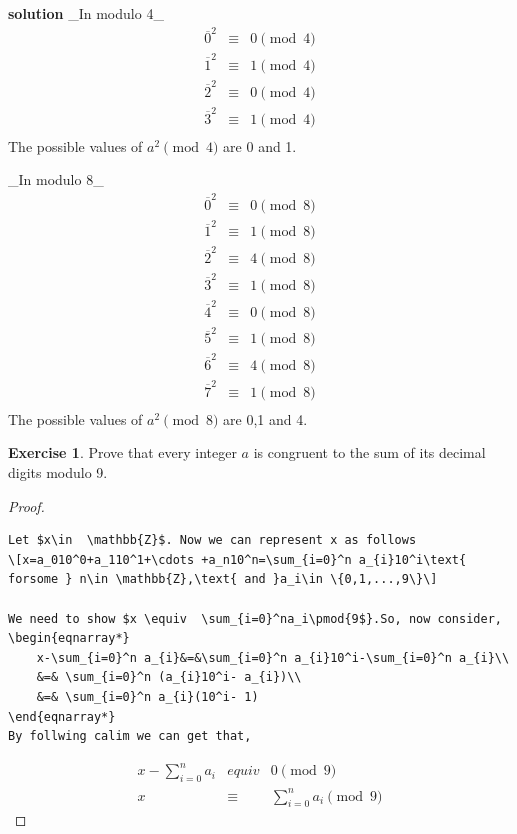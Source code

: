 \documentclass[
]{book}
\theoremstyle{definition}
\theoremstyle{definition}
\theoremstyle{definition}
\newtheorem{exercise}{Exercise}[chapter]
\theoremstyle{definition}
\theoremstyle{remark}
\begin{document}
\textbf{solution}
\_In modulo 4\_\\
\begin{eqnarray*}
    \overline{0}^2&\equiv & 0 \pmod{4}\\
    \overline{1}^2&\equiv & 1 \pmod{4}\\
    \overline{2}^2&\equiv & 0 \pmod{4}\\
    \overline{3}^2&\equiv & 1 \pmod{4}\\
\end{eqnarray*}
The possible values of \(a^2\pmod{4}\) are 0 and 1.

\_In modulo 8\_\\
\begin{eqnarray*}
    \overline{0}^2&\equiv & 0 \pmod{8}\\
    \overline{1}^2&\equiv & 1 \pmod{8}\\
    \overline{2}^2&\equiv & 4 \pmod{8}\\
    \overline{3}^2&\equiv & 1 \pmod{8}\\
    \overline{4}^2&\equiv & 0 \pmod{8}\\
    \overline{5}^2&\equiv & 1 \pmod{8}\\
    \overline{6}^2&\equiv & 4 \pmod{8}\\
    \overline{7}^2&\equiv & 1 \pmod{8}\\
\end{eqnarray*}
The possible values of \(a^2\pmod{8}\) are 0,1 and 4.

\begin{exercise}
\protect\hypertarget{exr:unnamed-chunk-16}{}\label{exr:unnamed-chunk-16}Prove that every integer \(a\) is congruent to the sum of its decimal digits modulo 9.
\end{exercise}

\begin{proof}
\leavevmode

\begin{verbatim}
Let $x\in  \mathbb{Z}$. Now we can represent x as follows
\[x=a_010^0+a_110^1+\cdots +a_n10^n=\sum_{i=0}^n a_{i}10^i\text{  forsome } n\in \mathbb{Z},\text{ and }a_i\in \{0,1,...,9\}\]

We need to show $x \equiv  \sum_{i=0}^na_i\pmod{9$}.So, now consider,
\begin{eqnarray*}
    x-\sum_{i=0}^n a_{i}&=&\sum_{i=0}^n a_{i}10^i-\sum_{i=0}^n a_{i}\\
    &=& \sum_{i=0}^n (a_{i}10^i- a_{i})\\
    &=& \sum_{i=0}^n a_{i}(10^i- 1)
\end{eqnarray*}
By follwing calim we can get that,
\end{verbatim}

\begin{eqnarray*}
    x-\sum_{i=0}^n a_i &equiv & 0 \pmod{9}\\
    x &\equiv & \sum_{i=0}^na_i\pmod{9}
\end{eqnarray*}

\end{proof}
\end{document}
